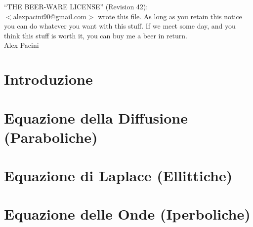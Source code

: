 \documentclass[a4paper]{report}
\begin{document}
%

%
\null
\vfill
%
	``THE BEER-WARE LICENSE'' (Revision 42): \\
	$<$alexpacini90@gmail.com$>$ wrote this file. 
	As long as you retain this notice you
	can do whatever you want with this stuff. 
	If we meet some day, and you think
	this stuff is worth it, you can buy me a beer in return.\\
	Alex Pacini
%
\newpage
\tableofcontents
\newpage
%
\chapter{Introduzione}	\label{chap:intro}

%
\chapter{Equazione della Diffusione (Paraboliche)}	\label{chap:diffusion}

%
\chapter{Equazione di Laplace (Ellittiche)}		\label{chap:laplacian}

%
\chapter{Equazione delle Onde (Iperboliche)}		\label{chap:waves}

%
\listoffigures
%
\end{document}
